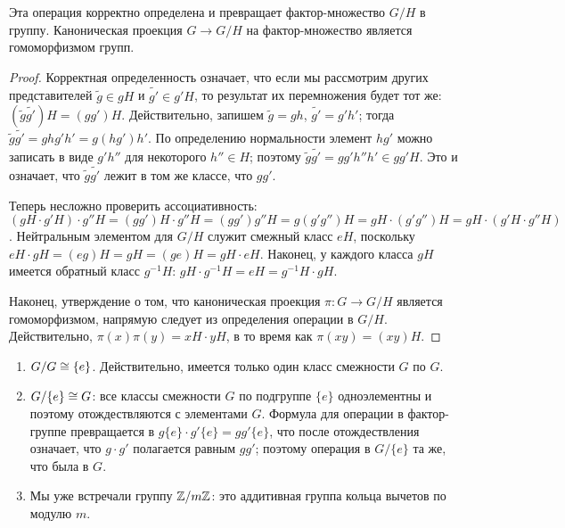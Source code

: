 \begin{theorem}
Эта операция корректно определена и превращает фактор-множество $G/H$
в группу. Каноническая проекция $G\to G/H$ на фактор-множество
является гомоморфизмом групп.
\end{theorem}
\begin{proof}
Корректная определенность означает, что если мы рассмотрим других
представителей $\widetilde{g}\in gH$ и $\widetilde{g'}\in g'H$, то
результат их перемножения будет тот же:
$(\widetilde{g}\widetilde{g'})H = (gg')H$. Действительно,
запишем $\widetilde{g} = gh$, $\widetilde{g'} = g'h'$; тогда
$\widetilde{g}\widetilde{g'} = ghg'h' = g(hg')h'$. По определению
нормальности элемент $hg'$ можно записать в виде $g'h''$ для
некоторого $h''\in H$; поэтому $\widetilde{g}\widetilde{g'} =
gg'h''h'\in gg'H$. Это и означает, что $\widetilde{g}\widetilde{g'}$
лежит в том же классе, что $gg'$.

Теперь несложно проверить ассоциативность: $(gH\cdot g'H)\cdot
g''H = (gg')H\cdot g''H = (gg')g''H = g(g'g'')H = gH\cdot (g'g'')H =
gH\cdot (g'H\cdot g''H)$. Нейтральным элементом для $G/H$ служит
смежный класс $eH$, поскольку $eH\cdot gH = (eg)H = gH = (ge)H =
gH\cdot eH$. Наконец, у каждого класса $gH$ имеется обратный класс
$g^{-1}H$: $gH\cdot g^{-1}H = eH = g^{-1}H\cdot gH$.

Наконец, утверждение о том, что каноническая проекция $\pi\colon G\to
G/H$ является гомоморфизмом, напрямую следует из определения операции
в $G/H$. Действительно, $\pi(x)\pi(y) = xH\cdot yH$, в то время как
$\pi(xy) = (xy)H$.
\end{proof}

\begin{examples}
\begin{enumerate}
\item $G/G\cong\{e\}$. Действительно, имеется только один класс
  смежности $G$ по $G$.
\item $G/\{e\}\cong G$: все классы смежности $G$ по подгруппе $\{e\}$
  одноэлементны и поэтому отождествляются с элементами
  $G$. Формула для операции в фактор-группе превращается в
  $g\{e\}\cdot g'\{e\} = gg'\{e\}$, что после отождествления означает,
  что $g\cdot g'$ полагается равным $gg'$; поэтому операция в
  $G/\{e\}$ та же, что была в $G$.
\item Мы уже встречали группу $\mathbb Z/m\mathbb Z$: это аддитивная группа
  кольца вычетов по модулю $m$.
\end{enumerate}
\end{examples}

